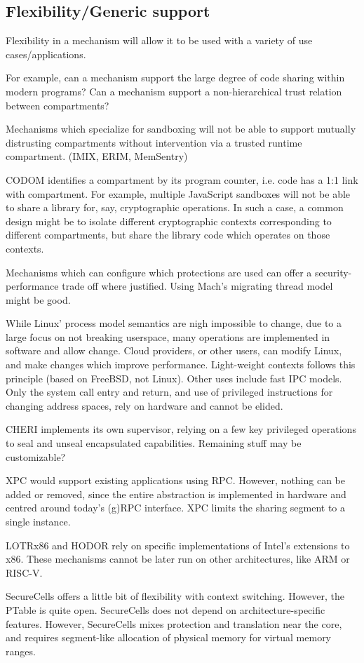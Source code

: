 \subsection{Flexibility/Generic support}

Flexibility in a mechanism will allow it to be used with a variety of
use cases/applications.

For example, can a mechanism support the large degree of code sharing
within modern programs?
Can a mechanism support a non-hierarchical trust relation between
compartments?

Mechanisms which specialize for sandboxing will not be able to
support mutually distrusting compartments without intervention via a
trusted runtime compartment.
 (IMIX, ERIM, MemSentry)

CODOM identifies a compartment by its program counter, i.e. code has a
1:1 link with compartment.
For example, multiple JavaScript sandboxes will not be able to share
a library for, say, cryptographic operations.
In such a case, a common design might be to isolate different
cryptographic contexts corresponding to different compartments, but
share the library code which operates on those contexts.

Mechanisms which can configure which protections are used can offer a
security-performance trade off where justified.
Using Mach's migrating thread model might be good.

While Linux' process model semantics are nigh impossible to change, due to
a large focus on not breaking userspace, many operations are implemented
in software and allow change.
Cloud providers, or other users, can modify Linux, and make changes which
improve performance. 
Light-weight contexts follows this principle (based on FreeBSD, not Linux).
Other uses include fast IPC models. 
Only the system call entry and return, and use of privileged instructions
for changing address spaces, rely on hardware and cannot be elided.

CHERI implements its own supervisor, relying on a few key privileged
operations to seal and unseal encapsulated capabilities.
Remaining stuff may be customizable?

XPC would support existing applications using RPC. 
However, nothing can be added or removed, since the entire abstraction
is implemented in hardware and centred around today's (g)RPC interface.
XPC limits the sharing segment to a single instance.

LOTRx86 and HODOR rely on specific implementations of Intel's
extensions to x86. 
These mechanisms cannot be later run on other architectures, like
ARM or RISC-V.

SecureCells offers a little bit of flexibility with context switching.
However, the PTable is quite open.
SecureCells does not depend on architecture-specific features.
However, SecureCells mixes protection and translation near the core,
and requires segment-like allocation of physical memory for virtual
memory ranges.

